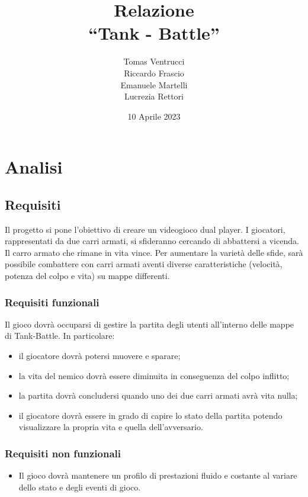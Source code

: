 \documentclass[a4paper,12pt]{report}
\title{Relazione \\``Tank - Battle''}
\author{Tomas Ventrucci \\Riccardo Frascio \\Emanuele Martelli \\Lucrezia Rettori}
\date{10 Aprile 2023}
\begin{document}
\maketitle

\tableofcontents

\chapter{Analisi}

\section{Requisiti}
Il progetto si pone l’obiettivo di creare un videogioco dual player. I giocatori, rappresentati da due carri armati, si sfideranno cercando di abbattersi a vicenda. Il carro armato che rimane in vita vince. Per aumentare la varietà delle sfide, sarà possibile combattere con carri armati aventi diverse caratteristiche (velocità, potenza del colpo e vita) su mappe differenti.

\subsection*{Requisiti funzionali}
Il gioco dovrà occuparsi di gestire la partita degli utenti all’interno delle mappe di Tank-Battle. In particolare:
    \begin{itemize}
        \item il giocatore dovrà potersi muovere e sparare;
        \item la vita del nemico dovrà essere diminuita in conseguenza del colpo inflitto;
        \item la partita dovrà concludersi quando uno dei due carri armati avrà vita nulla;
        \item il giocatore dovrà essere in grado di capire lo stato della partita potendo visualizzare la propria vita e quella dell'avversario.
    \end{itemize}
\subsection*{Requisiti non funzionali}
\begin{itemize}
	\item Il gioco dovrà mantenere un profilo di prestazioni fluido e costante al variare dello stato e degli eventi di gioco.
\end{itemize}
\end{document}
